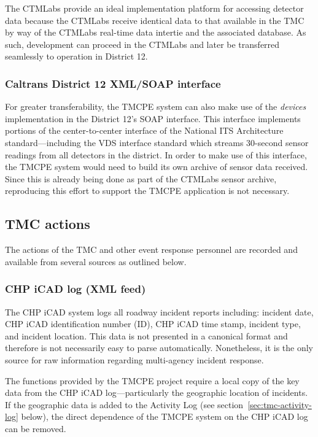 \documentclass[12pt]{report}
\newcounter{time}
\begin{document}
The \ac{CTMLabs} provide an ideal implementation platform for
accessing detector data because the \ac{CTMLabs} receive identical
data to that available in the \ac{TMC} by way of the \ac{CTMLabs}
real-time data intertie and the associated database.  As such,
development can proceed in the \ac{CTMLabs} and later be transferred
seamlessly to operation in District 12.

\subsubsection{Caltrans District 12 XML/SOAP interface}
\label{sec:d12-soap}

For greater transferability, the \ac{TMCPE} system can also make use
of the \emph{devices} implementation in the District 12's SOAP
interface.  This interface implements portions of the center-to-center
interface of the National ITS Architecture standard---including the
\ac{VDS} interface standard which streams 30-second sensor readings from
all detectors in the district.  In order to make use of this
interface, the \ac{TMCPE} system would need to build its own archive
of sensor data received.  Since this is already being done as part of
the \ac{CTMLabs} sensor archive, reproducing this effort to support
the \ac{TMCPE} application is not necessary.

\subsection{TMC actions}
\label{sec:tmc-actions}

The actions of the \ac{TMC} and other event response personnel are
recorded and available from several sources as outlined below.

\subsubsection{CHP iCAD log (XML feed)}
\label{sec:chp-icad-log}

The \ac{CHP} \ac{iCAD} system logs all roadway incident reports
including: incident date, \ac{CHP} \ac{iCAD} identification number
(ID), \ac{CHP} \ac{iCAD} time stamp, incident type, and incident
location. This data is not presented in a canonical format and
therefore is not necessarily easy to parse automatically.  Nonetheless,
it is the only source for raw information regarding multi-agency
incident response.

The functions provided by the \ac{TMCPE} project require a local copy
of the key data from the \ac{CHP} \ac{iCAD} log---particularly the
geographic location of incidents.  If the geographic data is added to
the Activity Log (see section~\ref{sec:tmc-activity-log} below), the
direct dependence of the \ac{TMCPE} system on the \ac{CHP} \ac{iCAD}
log can be removed.
\end{document}
